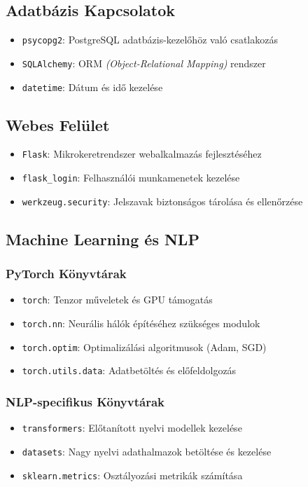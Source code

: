 \documentclass[12pt]{article}
\begin{document}
\subsection{Adatbázis Kapcsolatok}

\begin{itemize}
    \item \texttt{psycopg2}: PostgreSQL adatbázis-kezelőhöz való csatlakozás
    \item \texttt{SQLAlchemy}: ORM \textit{(Object-Relational Mapping)} rendszer
    \item \texttt{datetime}: Dátum és idő kezelése
\end{itemize}

\subsection{Webes Felület}

\begin{itemize}
    \item \texttt{Flask}: Mikrokeretrendszer webalkalmazás fejlesztéséhez
    \item \texttt{flask\_login}: Felhasználói munkamenetek kezelése
    \item \texttt{werkzeug.security}: Jelszavak biztonságos tárolása és ellenőrzése
\end{itemize}

\subsection{Machine Learning és NLP}

\subsubsection{PyTorch Könyvtárak}
\begin{itemize}
    \item \texttt{torch}: Tenzor műveletek és GPU támogatás
    \item \texttt{torch.nn}: Neurális hálók építéséhez szükséges modulok
    \item \texttt{torch.optim}: Optimalizálási algoritmusok (Adam, SGD)
    \item \texttt{torch.utils.data}: Adatbetöltés és előfeldolgozás
\end{itemize}

\subsubsection{NLP-specifikus Könyvtárak}
\begin{itemize}
    \item \texttt{transformers}: Előtanított nyelvi modellek kezelése
    \item \texttt{datasets}: Nagy nyelvi adathalmazok betöltése és kezelése
    \item \texttt{sklearn.metrics}: Osztályozási metrikák számítása
\end{itemize}
\end{document}
